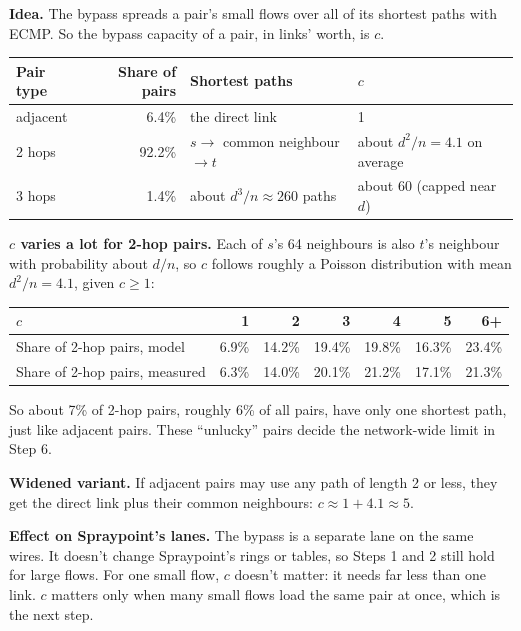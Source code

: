 \documentclass[11pt]{article}
\begin{document}
\textbf{Idea.} The bypass spreads a pair's small flows over all of its shortest paths with ECMP. So the bypass capacity of a pair, in links' worth, is $c$.

\begin{center}
\begin{tabularx}{\linewidth}{@{}l r L L@{}}
\toprule
Pair type & Share of pairs & Shortest paths & $c$ \\
\midrule
adjacent & 6.4\% & the direct link & 1 \\
2 hops & 92.2\% & $s \to$ common neighbour $\to t$ & about $d^2/n = 4.1$ on average \\
3 hops & 1.4\% & about $d^3/n \approx 260$ paths & about 60 (capped near $d$) \\
\bottomrule
\end{tabularx}
\end{center}

\textbf{$c$ varies a lot for 2-hop pairs.} Each of $s$'s 64 neighbours is also $t$'s neighbour with probability about $d/n$, so $c$ follows roughly a Poisson distribution with mean $d^2/n = 4.1$, given $c \ge 1$:

\begin{center}
\begin{tabular}{@{}lrrrrrr@{}}
\toprule
$c$ & 1 & 2 & 3 & 4 & 5 & 6+ \\
\midrule
Share of 2-hop pairs, model & 6.9\% & 14.2\% & 19.4\% & 19.8\% & 16.3\% & 23.4\% \\
Share of 2-hop pairs, measured & 6.3\% & 14.0\% & 20.1\% & 21.2\% & 17.1\% & 21.3\% \\
\bottomrule
\end{tabular}
\end{center}

So about 7\% of 2-hop pairs, roughly 6\% of all pairs, have only one shortest path, just like adjacent pairs. These ``unlucky'' pairs decide the network-wide limit in Step 6.

\textbf{Widened variant.} If adjacent pairs may use any path of length 2 or less, they get the direct link plus their common neighbours: $c \approx 1 + 4.1 \approx 5$.

\textbf{Effect on Spraypoint's lanes.} The bypass is a separate lane on the same wires. It doesn't change Spraypoint's rings or tables, so Steps 1 and 2 still hold for large flows. For one small flow, $c$ doesn't matter: it needs far less than one link. $c$ matters only when many small flows load the same pair at once, which is the next step.
\end{document}
